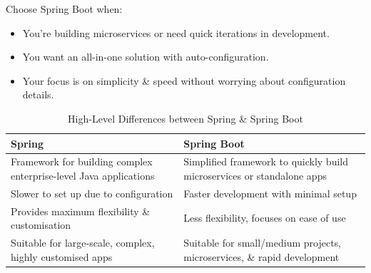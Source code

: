 \documentclass[a4paper,11pt]{article}
\begin{document}
Choose Spring Boot when:
\begin{itemize}
    \item   You're building microservices or need quick iterations in development.
    \item   You want an all-in-one solution with auto-configuration.
    \item   Your focus is on simplicity \& speed without worrying about configuration details.
\end{itemize}

\begin{table}[h!]
    \centering

    \begin{tabular}{|>{\arraybackslash}p{}|>{\arraybackslash}p{}|}
        \hline
        \textbf{Spring}                                                     & \textbf{Spring Boot} \\
        \hline
        Framework for building complex enterprise-level Java applications   & Simplified framework to quickly build microservices or standalone apps \\
        \hline
        Slower to set up due to configuration                               & Faster development with minimal setup \\
        \hline
        Provides maximum flexibility \& customisation                       & Less flexibility, focuses on ease of use \\
        \hline
        Suitable for large-scale, complex, highly customised apps           & Suitable for small/medium projects, microservices, \& rapid development \\
        \hline
    \end{tabular}
    \caption{High-Level Differences between Spring \& Spring Boot}
\end{table}
\end{document}
